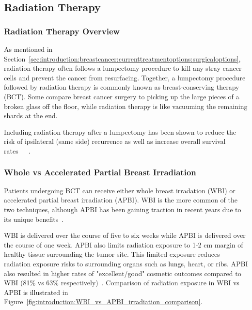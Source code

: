 \subsection{Radiation Therapy\label{sec:introduction:radiationtherapy}}
\subsubsection{Radiation Therapy Overview\label{sec:introduction:radiationtherapy:overview}}
As mentioned in Section~\ref{sec:introduction:breastcancer:currenttreatmentoptions:surgicaloptions}, radiation therapy often follows a lumpectomy procedure to kill any stray cancer cells and prevent the cancer from resurfacing. Together, a lumpectomy procedure followed by radiation therapy is commonly known as breast-conserving therapy (BCT). Some compare breast cancer surgery to picking up the large pieces of a broken glass off the floor, while radiation therapy is like vacuuming the remaining shards at the end.

Including radiation therapy after a lumpectomy has been shown to reduce the risk of ipsilateral (same side) recurrence as well as increase overall survival rates~\cite{RefWorks:RefID:157-thomasscience}~\cite{RefWorks:RefID:198-jiao2024interobserver}~\cite{RefWorks:RefID:375-joosten2013evaluation}.

\subsubsection{Whole vs Accelerated Partial Breast Irradiation\label{sec:introduction:radiationtherapy:wholevsacceleratedpartialbreastirradiation}}
Patients undergoing BCT can receive either whole breast irradation (WBI) or accelerated partial breast irradiation (APBI). WBI is the more common of the two techniques, although APBI has been gaining traction in recent years due to its unique benefits~\cite{RefWorks:RefID:157-thomasscience}.

WBI is delivered over the course of five to six weeks while APBI is delivered over the course of one week. APBI also limits radiation exposure to 1-2 cm margin of healthy tissue surrounding the tumor site. This limited exposure reduces radiation exposure risks to surrounding organs such as lungs, heart, or ribs. APBI also resulted in higher rates of "excellent/good" cosmetic outcomes compared to WBI (81\% vs 63\% respectively)~\cite{RefWorks:RefID:157-thomasscience}. Comparison of radiation exposure in WBI vs APBI is illustrated in Figure~\ref{fig:introduction:WBI_vs_APBI_irradiation_comparison}.

